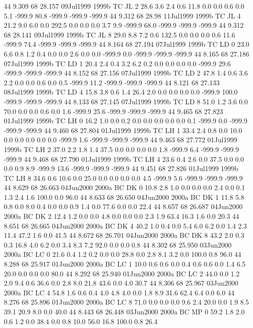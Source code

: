 44 9.309	68 28.157	09Jul1999	1999b	TC	JL	2	28.6	3.6	2.4	0.6	11.8	0.0	0.0	0.6	0.0	5.1	-999.9	80.8	-999.9	-999.9	-999.9
44 9.312	68 28.98	11Jul1999	1999b	TC	JL	4	21.2	9.0	6.0	0.0	292.5	0.0	0.0	0.0	3.7	9.9	-999.9	68.0	-999.9	-999.9	-999.9
44 9.312	68 28.141	09Jul1999	1999b	TC	JL	8	29.0	8.8	7.2	0.6	132.5	0.0	0.0	0.0	0.6	11.6	-999.9	74.4	-999.9	-999.9	-999.9
44 8.164	68 27.194	07Jul1999	1999b	TC	LD	0	23.0	6.6	0.8	1.2	0.4	0.0	0.0	2.6	0.0	0.0	-999.9	0.0	-999.9	-999.9	-999.9
44 8.165	68 27.186	07Jul1999	1999b	TC	LD	1	20.4	2.4	0.4	3.2	6.2	0.2	0.0	0.0	0.0	0.0	-999.9	29.6	-999.9	-999.9	-999.9
44 8.152	68 27.156	07Jul1999	1999b	TC	LD	2	47.8	1.4	0.6	3.6	2.2	0.0	0.0	0.6	0.0	0.5	-999.9	11.2	-999.9	-999.9	-999.9
44 8.121	68 27.133	08Jul1999	1999b	TC	LD	4	15.8	3.8	0.6	1.4	26.4	2.0	0.0	0.0	0.0	0.0	-999.9	100.0	-999.9	-999.9	-999.9
44 8.133	68 27.145	07Jul1999	1999b	TC	LD	8	51.0	1.2	3.6	0.0	70.0	0.0	0.0	0.6	0.0	1.6	-999.9	25.6	-999.9	-999.9	-999.9
44 9.465	68 27.823	01Jul1999	1999b	TC	LH	0	16.2	1.0	0.0	0.2	0.0	0.0	0.0	0.0	0.0	0.1	-999.9	0.0	-999.9	-999.9	-999.9
44 9.460	68 27.804	01Jul1999	1999b	TC	LH	1	33.4	2.4	0.8	0.0	10.0	0.0	0.0	0.0	0.0	0.0	-999.9	1.6	-999.9	-999.9	-999.9
44 9.463	68 27.772	01Jul1999	1999b	TC	LH	2	37.0	2.2	1.8	1.4	37.5	0.0	0.0	0.0	0.0	1.8	-999.9	6.4	-999.9	-999.9	-999.9
44 9.468	68 27.790	01Jul1999	1999b	TC	LH	4	23.6	0.4	2.6	0.0	37.5	0.0	0.0	0.0	0.9	8.9	-999.9	13.6	-999.9	-999.9	-999.9
44 9.451	68 27.826	01Jul1999	1999b	TC	LH	8	34.6	0.6	10.6	0.0	25.0	0.0	0.0	0.0	0.0	4.5	-999.9	5.6	-999.9	-999.9	-999.9
44 8.629	68 26.663	04Jun2000	2000a	BC	DK	0	10.8	2.8	1.0	0.0	0.0	0.0	2.4	0.0	0.1	1.3	2.4	1.6	100.0	0.0	96.0
44 8.633	68 26.650	04Jun2000	2000a	BC	DK	1	11.8	5.8	0.8	0.0	8.0	0.4	0.0	0.0	0.9	1.4	0.0	77.6	0.0	0.0	22.4
44 8.657	68 26.687	04Jun2000	2000a	BC	DK	2	12.4	1.2	0.0	0.0	4.8	0.0	0.0	0.0	2.3	1.9	63.4	16.3	1.6	0.0	20.3
44 8.651	68 26.665	04Jun2000	2000a	BC	DK	4	40.2	1.0	0.4	0.0	5.4	6.0	6.2	0.0	1.4	2.3	11.4	47.2	1.6	0.0	41.5
44 8.672	68 26.701	04Jun2000	2000a	BC	DK	8	43.2	2.0	0.3	0.3	16.8	4.0	6.2	0.0	3.4	8.3	7.2	92.0	0.0	0.0	0.8
44 8.302	68 25.950	03Jun2000	2000a	BC	LC	0	21.6	0.4	1.2	0.2	0.0	0.0	28.8	0.0	2.8	8.1	3.2	0.0	100.0	0.8	96.0
44 8.288	68 25.917	01Jun2000	2000a	BC	LC	1	10.0	0.6	0.6	0.0	0.4	0.6	0.6	0.0	1.4	6.5	20.0	0.0	0.0	0.0	80.0
44 8.292	68 25.940	01Jun2000	2000a	BC	LC	2	44.0	0.0	1.2	2.0	9.4	0.6	36.6	0.0	2.8	8.0	21.8	43.6	0.0	4.0	30.7
44 8.306	68 25.967	03Jun2000	2000a	BC	LC	4	54.8	1.6	0.6	0.4	4.0	4.8	4.0	0.0	1.8	8.9	31.6	62.4	6.4	0.0	6.0
44 8.276	68 25.896	01Jun2000	2000a	BC	LC	8	71.0	0.0	0.0	0.0	9.6	2.4	20.0	0.0	1.9	8.5	39.1	20.9	8.0	0.0	40.0
44 8.443	68 26.448	03Jun2000	2000a	BC	MP	0	59.2	1.8	2.0	0.6	1.2	0.0	38.4	0.0	0.8	10.0	56.0	16.8	100.0	0.8	26.4

